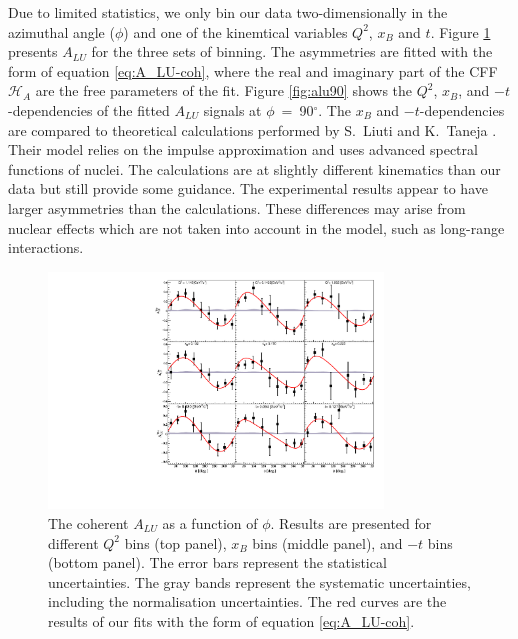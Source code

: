 \documentclass[preprint,nofootinbib,showpacs,prl,superscriptaddress,secnumarabic,amssymb,nobibnotes,aps,floatfix]{revtex4}
\begin{document}
Due to limited statistics, we only bin  our data two-dimensionally 
 in the azimuthal angle ($\phi$) and one of the kinemtical variables 
$Q^{2}$, $x_{B}$ and $t$. Figure \ref{fig:alu} presents $A_{LU}$ for the three
sets of binning. The asymmetries are fitted with the form of
equation \ref{eq:A_LU-coh}, where the real and imaginary part of the CFF
$\mathcal{H}_{A}$ are the free parameters of the fit. Figure \ref{fig:alu90} 
shows the $Q^2$, $x_{B}$, and $-t$-dependencies of the fitted $A_{LU}$ signals 
at $\phi$~=~90$^{\circ}$. The $x_{B}$ and $-t$-dependencies are compared to 
theoretical calculations performed by S.~Liuti and K.~Taneja 
\cite{simonetta_2}. Their model relies on the impulse approximation and uses 
advanced spectral functions of nuclei. The calculations are at slightly different 
kinematics than our data but still provide some guidance. The experimental 
results appear to have larger asymmetries than the calculations. These 
differences may arise from nuclear effects which are not taken into account in 
the model, such as long-range interactions.

\begin{figure}[tb]
\includegraphics[width=8.9cm]{figs/coherent-ALU.pdf}
\caption{The coherent $A_{LU}$ as a function of $\phi$. Results are presented
   for different $Q^{2}$ bins (top panel), $x_{B}$ bins (middle panel), and 
   $-t$ bins (bottom panel).  
   The error bars represent the statistical uncertainties. The gray 
   bands represent the systematic uncertainties, including the normalisation 
   uncertainties. The red curves are the results of our fits with the form of 
   equation \ref{eq:A_LU-coh}.}
\label{fig:alu}
\end{figure}
\end{document}
